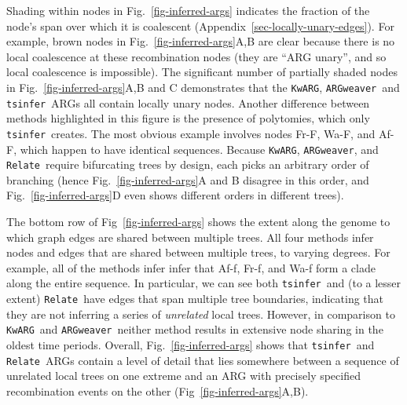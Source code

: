 \documentclass{article}
\newcommand{\noderef}[1]{\textsf{#1}}
\newcommand{\tsinfer}[0]{\texttt{tsinfer}}
\newcommand{\kwarg}[0]{\texttt{KwARG}}
\newcommand{\argweaver}[0]{\texttt{ARGweaver}}
\newcommand{\relate}[0]{\texttt{Relate}}
\begin{document}
Shading within nodes in Fig.~\ref{fig-inferred-args} indicates the
fraction of the node's span over which it is coalescent
(Appendix~\ref{sec-locally-unary-edges}). For example, brown nodes
in Fig.~\ref{fig-inferred-args}A,B are clear because there is
no local coalescence at these recombination nodes
(they are ``ARG unary'', and so local coalescence is impossible).
The significant number of partially shaded nodes in
Fig.~\ref{fig-inferred-args}A,B and C demonstrates that
the \kwarg, \argweaver\ and \tsinfer\ ARGs all contain locally unary nodes.
Another difference between methods highlighted in this figure
is the presence of polytomies, which only
\tsinfer\ creates. The most obvious example
involves nodes \noderef{Fr-F}, \noderef{Wa-F}, and \noderef{Af-F},
which happen to have identical sequences.
Because \kwarg, \argweaver, and \relate\ require
bifurcating trees by design, each picks an arbitrary order of branching
(hence Fig.~\ref{fig-inferred-args}A and B disagree
in this order, and Fig.~\ref{fig-inferred-args}D even shows different
orders in different trees).

The bottom row of Fig~\ref{fig-inferred-args} shows the extent along
the genome to which graph edges are shared between multiple trees.
All four methods infer nodes and edges that are shared between
multiple trees, to varying degrees.
For example, all of the methods infer
infer that \noderef{Af-f}, \noderef{Fr-f}, and \noderef{Wa-f}
form a clade along the entire sequence.
In particular, we can
see both \tsinfer\ and (to a lesser extent) \relate\ have edges
that span multiple tree boundaries, indicating that they are not inferring
a series of \emph{unrelated} local trees.
However, in comparison to \kwarg\ and \argweaver\ neither
method results in extensive node sharing in the
oldest time periods.
Overall, Fig.~\ref{fig-inferred-args} shows
that \tsinfer\ and \relate\ ARGs contain a level of detail
that lies somewhere between a sequence of unrelated local trees on one extreme
and an ARG with precisely specified recombination events on the other
(Fig~\ref{fig-inferred-args}A,B).
\end{document}
